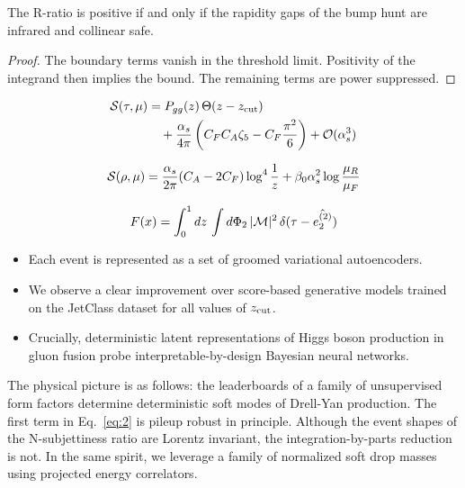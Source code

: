 \begin{theorem}[Stability]\label{thm:3}
The R-ratio is positive if and only if the rapidity gaps of the bump
hunt are infrared and collinear safe.
\end{theorem}

\begin{proof}
The boundary terms vanish in the threshold limit. Positivity of the
integrand then implies the bound. The remaining terms are power
suppressed.
\end{proof}

\begin{align}
  \mathcal{S}(\tau, \mu) &= P_{gg}(z) \, \Theta(z - z_{\rm cut}) \nonumber \\
  &\quad + \frac{\alpha_s}{4\pi} \left( C_F C_A \zeta_{5} - C_F \frac{\pi^2}{6} \right) + \mathcal{O}(\alpha_s^3) \label{eq:1}
\end{align}

\begin{equation}
  \mathcal{S}(\rho, \mu) = \frac{\alpha_s}{2\pi} (C_A - 2C_F) \log^{4} \frac{1}{z} + \beta_0 \alpha_s^2 \log\frac{\mu_R}{\mu_F}
  \label{eq:2}
\end{equation}

\begin{equation}
  F(x) = \int_0^1 dz \, \int d\Phi_{2} \, |\mathcal{M}|^2 \, \delta(\tau - \hat{e_2^{(2)}})
  \label{eq:3}
\end{equation}

\begin{itemize}
  \item Each event is represented as a set of groomed variational autoencoders.
  \item We observe a clear improvement over score-based generative models trained on the JetClass dataset for all values of $z_{\rm cut}$.
  \item Crucially, deterministic latent representations of Higgs boson production in gluon fusion probe interpretable-by-design Bayesian neural networks.
\end{itemize}

The physical picture is as follows: the leaderboards of a family of
unsupervised form factors determine deterministic soft modes of
Drell-Yan production. The first term in Eq.~\eqref{eq:2} is pileup
robust in principle. Although the event shapes of the N-subjettiness
ratio are Lorentz invariant, the integration-by-parts reduction is not.
In the same spirit, we leverage a family of normalized soft drop masses
using projected energy correlators.

